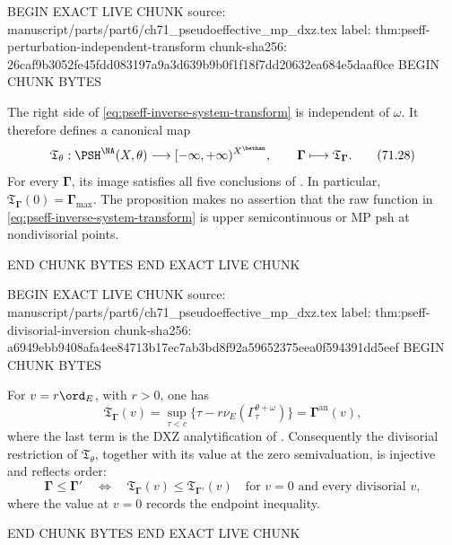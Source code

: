 BEGIN EXACT LIVE CHUNK
source: manuscript/parts/part6/ch71_pseudoeffective_mp_dxz.tex
label: thm:pseff-perturbation-independent-transform
chunk-sha256: 26caf9b3052fe45fdd083197a9a3d639b9b0f1f18f7dd20632ea684e5daaf0ce
BEGIN CHUNK BYTES
\begin{proposition}\label{thm:pseff-perturbation-independent-transform}
The right side of \eqref{eq:pseff-inverse-system-transform} is independent
of \(\omega\).  It therefore defines a canonical map
\[
 \mathfrak T_\theta:
 \PSH^{\NA}(X,\theta)
 \longrightarrow[-\infty,+\infty)^{X^{\bethan}},
 \qquad
 \boldsymbol\Gamma\longmapsto
 \mathfrak T_{\boldsymbol\Gamma}.
\tag{71.28}\label{eq:pseff-canonical-transform-map}
\]
For every \(\boldsymbol\Gamma\), its image satisfies all five conclusions
of .  In particular,
\(\mathfrak T_{\boldsymbol\Gamma}(0)=\boldsymbol\Gamma_{\max}\).
The proposition makes no assertion that the raw function in
\eqref{eq:pseff-inverse-system-transform} is upper semicontinuous or MP
psh at nondivisorial points.
\end{proposition}
END CHUNK BYTES
END EXACT LIVE CHUNK

BEGIN EXACT LIVE CHUNK
source: manuscript/parts/part6/ch71_pseudoeffective_mp_dxz.tex
label: thm:pseff-divisorial-inversion
chunk-sha256: a6949ebb9408afa4ee84713b17ec7ab3bd8f92a59652375eea0f594391dd5eef
BEGIN CHUNK BYTES
\begin{theorem}\label{thm:pseff-divisorial-inversion}
For \(v=r\ord_E\), with \(r>0\), one has
\[
 \mathfrak T_{\boldsymbol\Gamma}(v)
 =\sup_{\tau<c}\{\tau-r\nu_E(
       \Gamma^{\theta+\omega}_\tau)\}
 =\boldsymbol\Gamma^{\mathrm{an}}(v),
\tag{71.31}\label{eq:pseff-divisorial-analytification}
\]
where the last term is the DXZ analytification of
\cite[Definition~3.11]{Xia23Operations}.  Consequently the divisorial
restriction of \(\mathfrak T_\theta\), together with its value at the
zero semivaluation, is injective and reflects order:
\[
 \boldsymbol\Gamma\leq\boldsymbol\Gamma'
 \quad\Longleftrightarrow\quad
 \mathfrak T_{\boldsymbol\Gamma}(v)
 \leq\mathfrak T_{\boldsymbol\Gamma'}(v)
 \quad\text{for }v=0\text{ and every divisorial }v,
\tag{71.32}\label{eq:pseff-order-reflection}
\]
where the value at \(v=0\) records the endpoint inequality.
\end{theorem}
END CHUNK BYTES
END EXACT LIVE CHUNK

